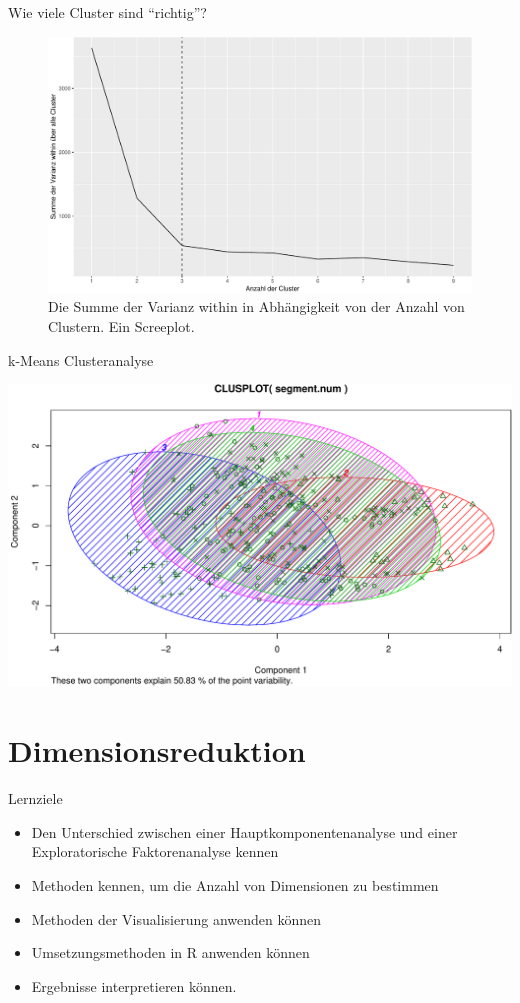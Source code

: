 \begin{frame}{Wie viele Cluster sind ``richtig''?}

\begin{figure}

{\centering \includegraphics[width=0.5\linewidth]{PraDa_Folien_nm_2_files/figure-beamer/cluster4-1} 

}

\caption{Die Summe der Varianz within in Abhängigkeit von der Anzahl von Clustern. Ein Screeplot.}\label{fig:cluster4}
\end{figure}

\end{frame}

\begin{frame}{k-Means Clusteranalyse}

\begin{center}\includegraphics[width=0.8\linewidth]{PraDa_Folien_nm_2_files/figure-beamer/unnamed-chunk-24-1} \end{center}

\end{frame}

\section{Dimensionsreduktion}\label{dimensionsreduktion}

\begin{frame}{Lernziele}

\begin{itemize}
\tightlist
\item
  Den Unterschied zwischen einer Hauptkomponentenanalyse und einer
  Exploratorische Faktorenanalyse kennen
\item
  Methoden kennen, um die Anzahl von Dimensionen zu bestimmen
\item
  Methoden der Visualisierung anwenden können
\item
  Umsetzungsmethoden in R anwenden können
\item
  Ergebnisse interpretieren können.
\end{itemize}

\end{frame}

